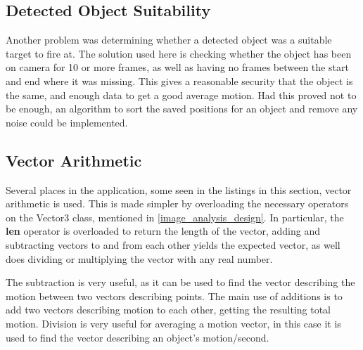 

\subsection{Detected Object Suitability}

Another problem was determining whether a detected object was a suitable target to fire at. The solution used here is
checking whether the object has been on camera for 10 or more frames, as well as having no frames between the start and
end where it was missing. This gives a reasonable security that the object is the same, and enough data
to get a good average motion. Had this proved not to be enough, an algorithm to sort the saved positions for an object
and remove any noise could be implemented.

\subsection{Vector Arithmetic}
Several places in the application, some seen in the listings in this section, vector arithmetic is used. This is
made simpler by overloading the necessary operators on the Vector3 class, mentioned in \autoref{image_analysis_design}.
In particular, the \textbf{len} operator is overloaded to return the length of the vector, 
adding and subtracting vectors to and from each other yields the expected vector, as well does dividing or multiplying
the vector with any real number.

The subtraction is very useful, as it can be used to find the vector describing the motion between two vectors describing
points. The main use of additions is to add two vectors describing motion to each other, getting the resulting total motion.
Division is very useful for averaging a motion vector, in this case it is used to find the vector describing an object's
motion/second.
